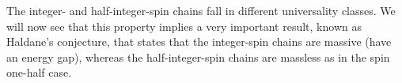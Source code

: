 The integer- and half-integer-spin chains fall in different universality classes. We will now see that this property implies a very important result, known as Haldane's conjecture, that states that the integer-spin chains are massive (have an energy gap), whereas the half-integer-spin chains are massless as in the spin one-half case.